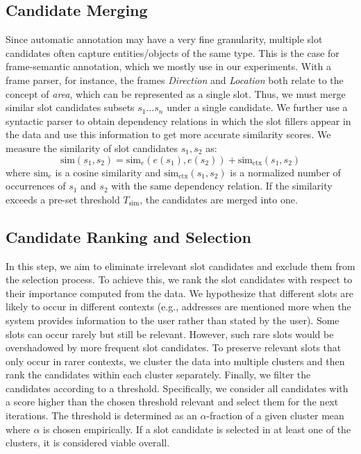 \subsection{Candidate Merging}
\label{03:candidate_merging}
Since automatic annotation may have a very fine granularity, multiple slot candidates often capture entities/objects of the same type.
This is the case for frame-semantic annotation, which we mostly use in our experiments.
With a frame parser, for instance, the frames \emph{Direction} and \emph{Location} both relate to the concept of \emph{area}, which can be represented as a single slot.
Thus, we must merge similar slot candidates subsets $s_1 \dots s_n$ under a single candidate.
We further use a syntactic parser to obtain dependency relations in which the slot fillers appear in the data and use this information to get more accurate similarity scores.
We measure the similarity of slot candidates $s_1,s_2$ as:
\begin{equation}
    \text{sim}(s_1,s_2) = \text{sim}_{e}(e(s_1),e(s_2)) + \text{sim}_{\text{ctx}}(s_1,s_2)
\end{equation}
where $\text{sim}_{e}$ is a cosine similarity and $\text{sim}_{\text{ctx}}(s_1,s_2)$ is a normalized number of occurrences of $s_1$ and $s_2$ with the same dependency relation.
If the similarity exceeds a pre-set threshold $T_{\text{sim}}$, the candidates are merged into one.

\subsection{Candidate Ranking and Selection}
\label{04:candidate_select}
In this step, we aim to eliminate irrelevant slot candidates and exclude them from the selection process.
To achieve this, we rank the slot candidates with respect to their importance computed from the data.
We hypothesize that different slots are likely to occur in different contexts (e.g., addresses are mentioned more when the system provides information to the user rather than stated by the user).
Some slots can occur rarely but still be relevant.
However, such rare slots would be overshadowed by more frequent slot candidates.
To preserve relevant slots that only occur in rarer contexts, we cluster the data into multiple clusters and then rank the candidates within each cluster separately.
Finally, we filter the candidates according to a threshold.
Specifically, we consider all candidates with a score higher than the chosen threshold relevant and select them for the next iterations.
The threshold is determined as an $\alpha$-fraction of a given cluster mean where $\alpha$ is chosen empirically.
If a slot candidate is selected in at least one of the clusters, it is considered viable overall.

